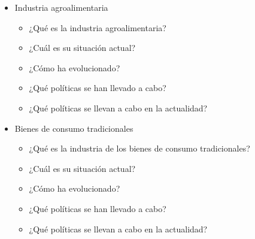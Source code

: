 \documentclass{nuevotema}
\begin{document}
\ideaclave




\begin{itemize}
	\item Industria agroalimentaria
\begin{itemize}
	\item ¿Qué es la industria agroalimentaria?
	\item ¿Cuál es su situación actual?
	\item ¿Cómo ha evolucionado?
	\item ¿Qué políticas se han llevado a cabo?
	\item ¿Qué políticas se llevan a cabo en la actualidad?
\end{itemize}

	\item Bienes de consumo tradicionales
\begin{itemize}
	\item ¿Qué es la industria de los bienes de consumo tradicionales?
	\item ¿Cuál es su situación actual?
	\item ¿Cómo ha evolucionado?
	\item ¿Qué políticas se han llevado a cabo?
	\item ¿Qué políticas se llevan a cabo en la actualidad?
\end{itemize}
\end{itemize}

\esquemacorto
\end{document}
